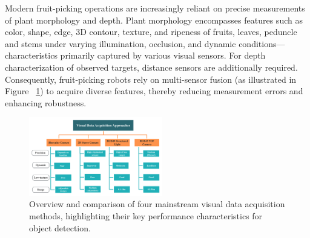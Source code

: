 \documentclass[a4paper,fleqn]{cas-dc}
\begin{document}
Modern fruit-picking operations are increasingly reliant on precise measurements of plant morphology and depth. Plant morphology encompasses features such as color, shape, edge, 	3D contour, texture, and ripeness of fruits, leaves, peduncle and stems under varying illumination, occlusion, and dynamic conditions—characteristics primarily captured by various visual sensors. For depth characterization of observed targets, distance sensors are additionally required. 
Consequently, fruit-picking robots rely on multi-sensor fusion (as illustrated in Figure ~\ref{fig:camera}) to acquire diverse features, thereby reducing measurement errors and enhancing robustness.
\begin{figure}[hbtp]
\centering
\includegraphics[width=0.52\textwidth]{fig_camera1.png}
\caption{Overview and comparison of four mainstream visual data acquisition methods, highlighting their key performance characteristics for object detection.}
\label{fig:camera}
\end{figure}
\end{document}
